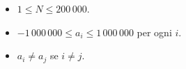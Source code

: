 \Constraints

\begin{itemize}[nolistsep, itemsep=2mm]
    \item $1 \leq N \leq 200\,000$.
    \item $-1\,000\,000 \leq a_i \leq 1\,000\,000$ per ogni $i$.
    \item $a_i \neq a_j$ se $i \neq j$.
\end{itemize}



\Examples

\begin{example}
%
\end{example}




